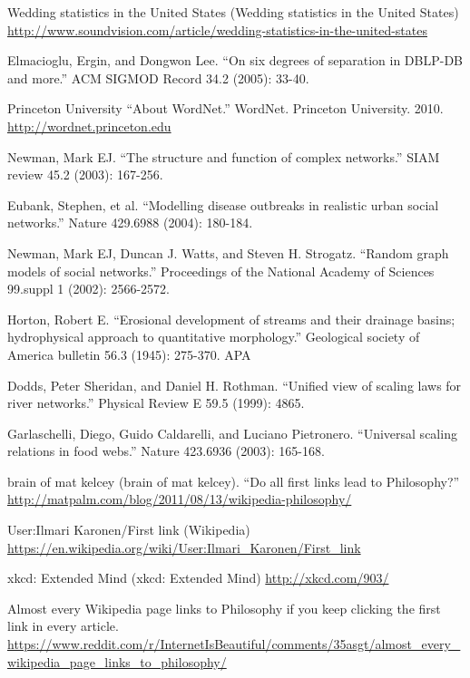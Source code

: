 \documentclass[11pt]{report}
\begin{document}
\begin{thebibliography}{1}
     Wedding statistics in the United States (Wedding statistics in the United States)
    \url{http://www.soundvision.com/article/wedding-statistics-in-the-united-states}

     Elmacioglu, Ergin, and Dongwon Lee. ``On six degrees of separation in DBLP-DB and more.'' ACM SIGMOD Record 34.2 (2005): 33-40.

     Princeton University ``About WordNet.'' WordNet. Princeton University. 2010. 
    \url{http://wordnet.princeton.edu}

     Newman, Mark EJ. ``The structure and function of complex networks.'' SIAM review 45.2 (2003): 167-256.

     Eubank, Stephen, et al. ``Modelling disease outbreaks in realistic urban social networks.'' Nature 429.6988 (2004): 180-184.

     Newman, Mark EJ, Duncan J. Watts, and Steven H. Strogatz. ``Random graph models of social networks.'' Proceedings of the National Academy of Sciences 99.suppl 1 (2002): 2566-2572.

     Horton, Robert E. ``Erosional development of streams and their drainage basins; hydrophysical approach to quantitative morphology.'' Geological society of America bulletin 56.3 (1945): 275-370.
    APA

     Dodds, Peter Sheridan, and Daniel H. Rothman. ``Unified view of scaling laws for river networks.'' Physical Review E 59.5 (1999): 4865.

     Garlaschelli, Diego, Guido Caldarelli, and Luciano Pietronero. ``Universal scaling relations in food webs.'' Nature 423.6936 (2003): 165-168.
    
     brain of mat kelcey (brain of mat kelcey). 
    ``Do all first links lead to Philosophy?''
    \url{http://matpalm.com/blog/2011/08/13/wikipedia-philosophy/}

     User:Ilmari Karonen/First link (Wikipedia)
    \url{https://en.wikipedia.org/wiki/User:Ilmari_Karonen/First_link}

     xkcd: Extended Mind (xkcd: Extended Mind)
    \url{http://xkcd.com/903/}

     Almost every Wikipedia page links to Philosophy if you keep clicking the first link in every article. 
    \url{https://www.reddit.com/r/InternetIsBeautiful/comments/35asgt/almost_every_wikipedia_page_links_to_philosophy/}


\end{thebibliography}
\end{document}
